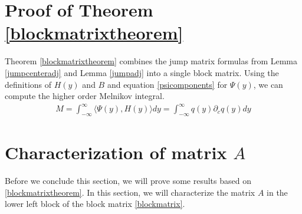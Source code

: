 \documentclass[thesis.tex]{subfiles}
\begin{document}
\section{Proof of Theorem \ref{blockmatrixtheorem}}

Theorem \ref{blockmatrixtheorem} combines the jump matrix formulas from Lemma \ref{jumpcenteradj} and Lemma \ref{jumpadj} into a single block matrix. Using the definitions of $H(y)$ and $B$ and equation \cref{psicomponents} for $\Psi(y)$, we can compute the higher order Melnikov integral.
\begin{align*}
M = \int_{-\infty}^\infty \langle \Psi(y), H(y) \rangle dy = \int_{-\infty}^\infty q(y) \partial_c q(y) dy
\end{align*}

\section{Characterization of matrix $A$}

Before we conclude this section, we will prove some results based on \cref{blockmatrixtheorem}. In this section, we will characterize the matrix $A$ in the lower left block of the block matrix \cref{blockmatrix}. 
\end{document}
